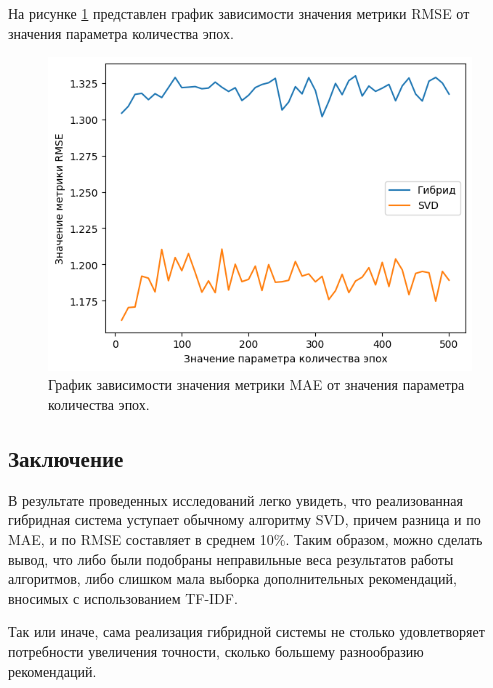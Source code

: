 На рисунке \ref{img:4} представлен график зависимости значения метрики RMSE от значения параметра количества эпох.

\begin{figure}[H]
	\centering
	\includegraphics[width=\textwidth]{inc/4.png}
	\caption{ График зависимости значения метрики MAE от значения параметра количества эпох.}
	\label{img:4}
\end{figure}


\subsection*{Заключение}

В результате проведенных исследований легко увидеть, что реализованная гибридная система уступает обычному алгоритму SVD, причем разница и по MAE, и по RMSE составляет в среднем 10\%. Таким образом, можно сделать вывод, что либо были подобраны неправильные веса результатов работы алгоритмов, либо слишком мала выборка дополнительных рекомендаций, вносимых с использованием TF-IDF.

Так или иначе, сама реализация гибридной системы не столько удовлетворяет потребности увеличения точности, сколько большему разнообразию рекомендаций.
